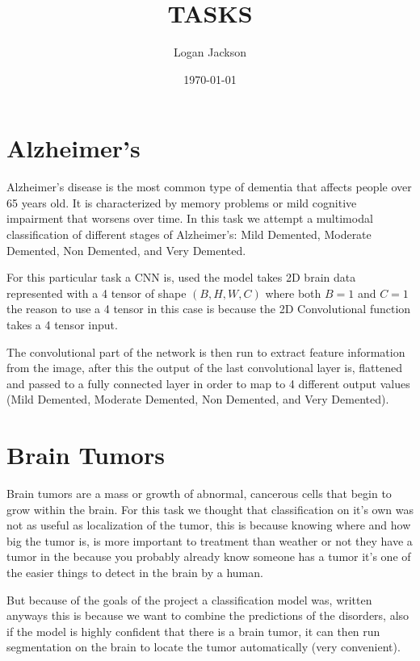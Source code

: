 \documentclass[11pt]{article}
\author{Logan Jackson}
\date{\today}
\title{TASKS}
\begin{document}
\maketitle
\tableofcontents



\section{Alzheimer's}
\label{sec:org4ad5476}

Alzheimer’s disease is the most common type of dementia that affects people over 65 years old.
It is characterized by memory problems or mild cognitive impairment that worsens over time.
In this task we attempt a multimodal classification of different stages of Alzheimer's: Mild Demented,
Moderate Demented, Non Demented, and Very Demented.

For this particular task a CNN is, used the model takes 2D brain data represented with a 4 tensor of shape \((B, H, W, C)\)
where both \(B=1\) and \(C=1\) the reason to use a 4 tensor in this case is because the 2D Convolutional function takes a 4 tensor input.

The convolutional part of the network is then run to extract feature information from the image, after this
the output of the last convolutional layer is, flattened and passed to a fully connected layer in order to map
to 4 different output values (Mild Demented, Moderate Demented, Non Demented, and Very Demented).

\section{Brain Tumors}
\label{sec:org3948501}

Brain tumors are a mass or growth of abnormal, cancerous cells that begin to grow within the brain. For this task
we thought that classification on it's own was not as useful as localization of the tumor, this is because knowing
where and how big the tumor is, is more important to treatment than weather or not they have a tumor in the because
you probably already know someone has a tumor it's one of the easier things to detect in the brain by a human.

But because of the goals of the project a classification model was, written anyways this is because we want to combine
the predictions of the disorders, also if the model is highly confident that there is a brain tumor, it can then run
segmentation on the brain to locate the tumor automatically (very convenient).
\end{document}
